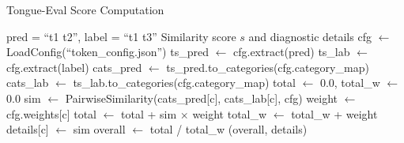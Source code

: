 \begin{algorithm}
\caption{Tongue-Eval Score Computation}
\label{alg:tongue-eval}
\begin{algorithmic}[1] 
    \Require pred = ``t1 t2'', label = ``t1 t3'' 
    \Ensure Similarity score $s$ and diagnostic details 
    \State
        \State cfg $\gets$ LoadConfig(``token\_config.json'') 
        \State ts\_pred $\gets$ cfg.extract(pred) 
        \State ts\_lab $\gets$ cfg.extract(label) 
        \State cats\_pred $\gets$ ts\_pred.to\_categories(cfg.category\_map) 
        \State cats\_lab $\gets$ ts\_lab.to\_categories(cfg.category\_map) 
        \State total $\gets$ 0.0, total\_w $\gets$ 0.0 
            \State sim $\gets$ PairwiseSimilarity(cats\_pred[c], cats\_lab[c], cfg)
            \State weight $\gets$ cfg.weights[c] 
            \State total $\gets$ total + sim $\times$ weight
            \State total\_w $\gets$ total\_w + weight
            \State details[c] $\gets$ sim 
        \EndFor
        \State overall $\gets$ total / total\_w 
        \State \Return (overall, details)
    \EndFunction
\end{algorithmic}
\end{algorithm} 